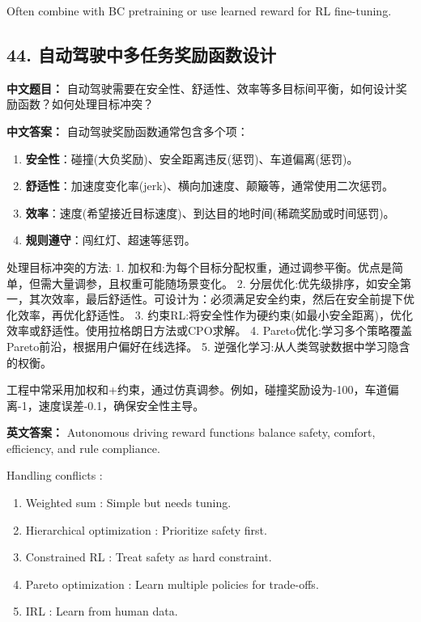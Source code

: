 \documentclass[10pt,a4paper]{ctexart}
\begin{document}
Often combine with BC pretraining or use learned reward for RL fine-tuning.

\subsection*{44. 自动驾驶中多任务奖励函数设计}
\textbf{中文题目：} 自动驾驶需要在安全性、舒适性、效率等多目标间平衡，如何设计奖励函数？如何处理目标冲突？

\textbf{中文答案：}  
自动驾驶奖励函数通常包含多个项：
\begin{enumerate}
    \item \textbf{安全性}：碰撞(大负奖励)、安全距离违反(惩罚)、车道偏离(惩罚)。
    \item \textbf{舒适性}：加速度变化率(jerk)、横向加速度、颠簸等，通常使用二次惩罚。
    \item \textbf{效率}：速度(希望接近目标速度)、到达目的地时间(稀疏奖励或时间惩罚)。
    \item \textbf{规则遵守}：闯红灯、超速等惩罚。
\end{enumerate}

 处理目标冲突的方法:
1.  加权和:为每个目标分配权重，通过调参平衡。优点是简单，但需大量调参，且权重可能随场景变化。
2.  分层优化:优先级排序，如安全第一，其次效率，最后舒适性。可设计为：必须满足安全约束，然后在安全前提下优化效率，再优化舒适性。
3.  约束RL:将安全性作为硬约束(如最小安全距离)，优化效率或舒适性。使用拉格朗日方法或CPO求解。
4.  Pareto优化:学习多个策略覆盖Pareto前沿，根据用户偏好在线选择。
5.  逆强化学习:从人类驾驶数据中学习隐含的权衡。

工程中常采用加权和+约束，通过仿真调参。例如，碰撞奖励设为-100，车道偏离-1，速度误差-0.1，确保安全性主导。

\textbf{英文答案：}  
Autonomous driving reward functions balance safety, comfort, efficiency, and rule compliance.

 Handling conflicts :
\begin{enumerate}
    \item Weighted sum : Simple but needs tuning.
    \item Hierarchical optimization : Prioritize safety first.
    \item Constrained RL : Treat safety as hard constraint.
    \item Pareto optimization : Learn multiple policies for trade-offs.
    \item IRL : Learn from human data.
\end{enumerate}
\end{document}
